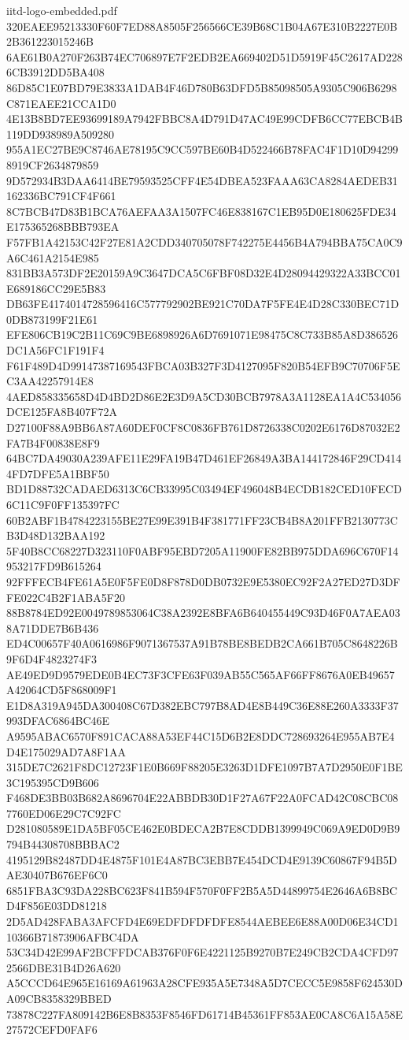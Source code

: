 \begin{filecontents*}[overwrite]{iitd-logo-embedded.pdf}
320EAEE95213330F60F7ED88A8505F256566CE39B68C1B04A67E310B2227E0B2B361223015246B
6AE61B0A270F263B74EC706897E7F2EDB2EA669402D51D5919F45C2617AD2286CB3912DD5BA408
86D85C1E07BD79E3833A1DAB4F46D780B63DFD5B85098505A9305C906B6298C871EAEE21CCA1D0
4E13B8BD7EE93699189A7942FBBC8A4D791D47AC49E99CDFB6CC77EBCB4B119DD938989A509280
955A1EC27BE9C8746AE78195C9CC597BE60B4D522466B78FAC4F1D10D942998919CF2634879859
9D572934B3DAA6414BE79593525CFF4E54DBEA523FAAA63CA8284AEDEB31162336BC791CF4F661
8C7BCB47D83B1BCA76AEFAA3A1507FC46E838167C1EB95D0E180625FDE34E175365268BBB793EA
F57FB1A42153C42F27E81A2CDD340705078F742275E4456B4A794BBA75CA0C9A6C461A2154E985
831BB3A573DF2E20159A9C3647DCA5C6FBF08D32E4D28094429322A33BCC01E689186CC29E5B83
DB63FE4174014728596416C577792902BE921C70DA7F5FE4E4D28C330BEC71D0DB873199F21E61
EFE806CB19C2B11C69C9BE6898926A6D7691071E98475C8C733B85A8D386526DC1A56FC1F191F4
F61F489D4D99147387169543FBCA03B327F3D4127095F820B54EFB9C70706F5EC3AA42257914E8
4AED858335658D4D4BD2D86E2E3D9A5CD30BCB7978A3A1128EA1A4C534056DCE125FA8B407F72A
D27100F88A9BB6A87A60DEF0CF8C0836FB761D8726338C0202E6176D87032E2FA7B4F00838E8F9
64BC7DA49030A239AFE11E29FA19B47D461EF26849A3BA144172846F29CD4144FD7DFE5A1BBF50
BD1D88732CADAED6313C6CB33995C03494EF496048B4ECDB182CED10FECD6C11C9F0FF135397FC
60B2ABF1B4784223155BE27E99E391B4F381771FF23CB4B8A201FFB2130773CB3D48D132BAA192
5F40B8CC68227D323110F0ABF95EBD7205A11900FE82BB975DDA696C670F14953217FD9B615264
92FFFECB4FE61A5E0F5FE0D8F878D0DB0732E9E5380EC92F2A27ED27D3DFFE022C4B2F1ABA5F20
88B8784ED92E0049789853064C38A2392E8BFA6B640455449C93D46F0A7AEA038A71DDE7B6B436
ED4C00657F40A0616986F9071367537A91B78BE8BEDB2CA661B705C8648226B9F6D4F4823274F3
AE49ED9D9579EDE0B4EC73F3CFE63F039AB55C565AF66FF8676A0EB49657A42064CD5F868009F1
E1D8A319A945DA300408C67D382EBC797B8AD4E8B449C36E88E260A3333F37993DFAC6864BC46E
A9595ABAC6570F891CACA88A53EF44C15D6B2E8DDC728693264E955AB7E4D4E175029AD7A8F1AA
315DE7C2621F8DC12723F1E0B669F88205E3263D1DFE1097B7A7D2950E0F1BE3C195395CD9B606
F468DE3BB03B682A8696704E22ABBDB30D1F27A67F22A0FCAD42C08CBC087760ED06E29C7C92FC
D281080589E1DA5BF05CE462E0BDECA2B7E8CDDB1399949C069A9ED0D9B9794B44308708BBBAC2
4195129B82487DD4E4875F101E4A87BC3EBB7E454DCD4E9139C60867F94B5DAE30407B676EF6C0
6851FBA3C93DA228BC623F841B594F570F0FF2B5A5D44899754E2646A6B8BCD4F856E03DD81218
2D5AD428FABA3AFCFD4E69EDFDFDFDFE8544AEBEE6E88A00D06E34CD110366B71873906AFBC4DA
53C34D42E99AF2BCFFDCAB376F0F6E4221125B9270B7E249CB2CDA4CFD972566DBE31B4D26A620
A5CCCD64E965E16169A61963A28CFE935A5E7348A5D7CECC5E9858F624530DA09CB8358329BBED
73878C227FA809142B6E8B8353F8546FD61714B45361FF853AE0CA8C6A15A58E27572CEFD0FAF6

\end{filecontents*}
